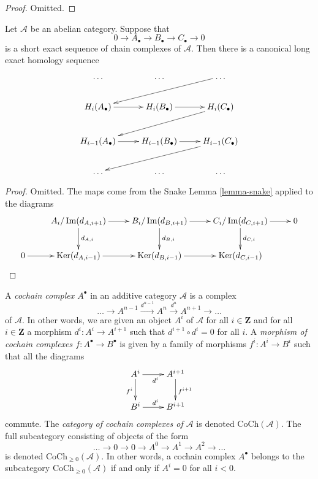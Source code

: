 \begin{proof}
Omitted.
\end{proof}

\begin{lemma}
\label{lemma-long-exact-sequence-chain}
Let $\mathcal{A}$ be an abelian category.
Suppose that
$$
0 \to
A_\bullet \to
B_\bullet \to
C_\bullet \to
0
$$
is a short exact sequence of chain complexes of $\mathcal{A}$.
Then there is a canonical long exact homology sequence
$$
\xymatrix{
\ldots & \ldots & \ldots \ar[lld] \\
H_i(A_\bullet) \ar[r] & H_i(B_\bullet) \ar[r] & H_i(C_\bullet) \ar[lld] \\
H_{i - 1}(A_\bullet) \ar[r] &
H_{i - 1}(B_\bullet) \ar[r] &
H_{i - 1}(C_\bullet) \ar[lld] \\
\ldots & \ldots & \ldots \\
}
$$
\end{lemma}

\begin{proof}
Omitted. The maps come from the Snake Lemma \ref{lemma-snake}
applied to the diagrams
$$
\xymatrix{
&
A_i/\Im(d_{A, i + 1}) \ar[r] \ar[d]^{d_{A, i}} &
B_i/\Im(d_{B, i + 1}) \ar[r] \ar[d]^{d_{B, i}} &
C_i/\Im(d_{C, i + 1}) \ar[r] \ar[d]^{d_{C, i}} &
0 \\
0 \ar[r] &
\Ker(d_{A, i - 1}) \ar[r] &
\Ker(d_{B, i - 1}) \ar[r] &
\Ker(d_{C, i - 1}) &
}
$$
\end{proof}

\noindent
A {\it cochain complex $A^\bullet$} in an additive category $\mathcal{A}$
is a complex
$$
\ldots \to
A^{n - 1} \xrightarrow{d^{n - 1}}
A^n \xrightarrow{d^n}
A^{n + 1} \to
\ldots
$$
of $\mathcal{A}$. In other words, we are given an object $A^i$ of
$\mathcal{A}$ for all $i \in \mathbf{Z}$ and for
all $i \in \mathbf{Z}$ a morphism $d^i : A^i \to A^{i + 1}$ such that
$d^{i + 1} \circ d^i = 0$ for all $i$. A {\it morphism of cochain
complexes $f : A^\bullet \to B^\bullet$} is given by a
family of morphisms $f^i : A^i \to B^i$ such that all
the diagrams
$$
\xymatrix{
A^i \ar[r]_{d^i} \ar[d]_{f^i} & A^{i + 1} \ar[d]^{f^{i + 1}} \\
B^i \ar[r]^{d^i} & B^{i + 1}
}
$$
commute. The {\it category of cochain complexes of $\mathcal{A}$}
is denoted $\text{CoCh}(\mathcal{A})$. The full subcategory consisting
of objects of the form
$$
\ldots \to 0 \to 0 \to A^0 \to A^1 \to A^2 \to \ldots
$$
is denoted $\text{CoCh}_{\geq 0}(\mathcal{A})$.
In other words, a cochain complex $A^\bullet$ belongs to the subcategory
$\text{CoCh}_{\geq 0}(\mathcal{A})$ if and only if
$A^i = 0$ for all $i < 0$.

